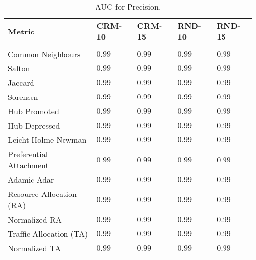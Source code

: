 \begin{table}[h]
	\centering
	\begin{tabular}{l l l l l}
	\toprule
	\textbf{Metric} & \textbf{CRM-10} & \textbf{CRM-15} & \textbf{RND-10} & \textbf{RND-15}\\\\
	\midrule
		Common Neighbours & $0.99$ & $0.99$ & $0.99$ & $0.99$ \\
		Salton  & $0.99$ & $0.99$ & $0.99$ & $0.99$ \\
		Jaccard  & $0.99$ & $0.99$ & $0.99$ & $0.99$ \\
		Sorensen   & $0.99$ & $0.99$ & $0.99$ & $0.99$ \\
		Hub Promoted  & $0.99$ & $0.99$ & $0.99$ & $0.99$ \\
		Hub Depressed  & $0.99$ & $0.99$ & $0.99$ & $0.99$ \\
		Leicht-Holme-Newman  & $0.99$ & $0.99$ & $0.99$ & $0.99$ \\
		Preferential Attachment  & $0.99$ & $0.99$ & $0.99$ & $0.99$ \\
		Adamic-Adar  & $0.99$ & $0.99$ & $0.99$ & $0.99$ \\
		Resource Allocation (RA)  & $0.99$ & $0.99$ & $0.99$ & $0.99$ \\
		Normalized RA  & $0.99$ & $0.99$ & $0.99$ & $0.99$ \\
		Traffic Allocation (TA)  & $0.99$ & $0.99$ & $0.99$ & $0.99$ \\
		Normalized TA  & $0.99$ & $0.99$ & $0.99$ & $0.99$ \\
	\bottomrule
	\end{tabular}
	\label{tab:auc-prediction}
	\caption{AUC for Precision.}
\end{table}	
     


